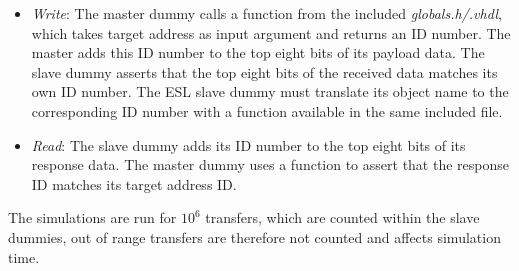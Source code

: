 \begin{itemize}
 \item \textit{Write}: The master dummy calls a function from the included \textit{globals.h/.vhdl}, which takes target address as input argument and returns an ID number. The master adds this ID number to the top eight bits of its payload data. The slave dummy asserts that the top eight bits of the received data matches its own ID number. The ESL slave dummy must translate its object name to the corresponding ID number with a function available in the same included file. 
 \item \textit{Read}: The slave dummy adds its ID number to the top eight bits of its response data. The master dummy uses a function to assert that the response ID matches its target address ID.   
\end{itemize}  

The simulations are run for $10^6$ transfers, which are counted within the slave dummies, out of range transfers are therefore not counted and affects simulation time.  

